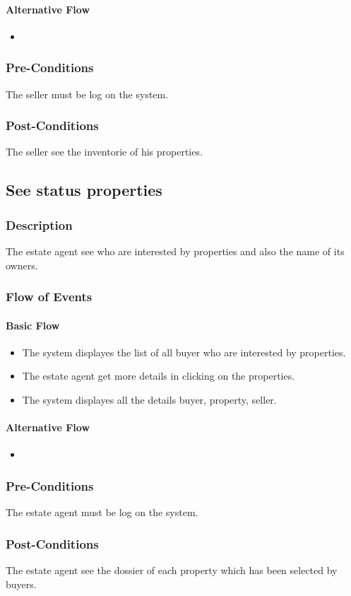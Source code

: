 \documentclass[a4paper,12pt]{article}
\begin{document}
\paragraph{Alternative Flow}
\begin{itemize}
\item
\end{itemize}
\subsubsection{Pre-Conditions}
The seller must be log on the system.
\subsubsection{Post-Conditions}
The seller see the inventorie of his properties.

\subsection{See status properties}
\subsubsection{Description}
The estate agent see who are interested by properties and also the name of its owners.
\subsubsection{Flow of Events}
\paragraph{Basic Flow}
\begin{itemize}
\item The system displayes the list of all buyer who are interested by properties.
\item The estate agent get more details in clicking on the properties.
\item The system displayes all the details buyer, property, seller.
\end{itemize}
\paragraph{Alternative Flow}
\begin{itemize}
\item
\end{itemize}
\subsubsection{Pre-Conditions}
The estate agent must be log on the system.
\subsubsection{Post-Conditions}
The estate agent see the dossier of each property which has been selected by buyers.
\end{document}
